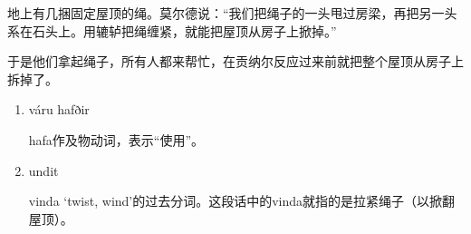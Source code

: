 \begin{translation*}{}
    地上有几捆固定屋顶的绳。莫尔德说：“我们把绳子的一头甩过房梁，再把另一头系在石头上。用辘轳把绳缠紧，就能把屋顶从房子上掀掉。”

    于是他们拿起绳子，所有人都来帮忙，在贡纳尔反应过来前就把整个屋顶从房子上拆掉了。
\end{translation*}
\begin{grammar*}{}
    \begin{enumerate}[leftmargin=*]
        \item váru hafðir

              hafa作及物动词，表示“使用”。
        \item undit

              vinda `twist, wind'的过去分词。这段话中的vinda就指的是拉紧绳子（以掀翻屋顶）。
    \end{enumerate}
\end{grammar*}

